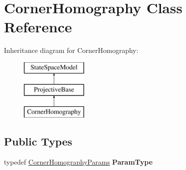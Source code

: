 \hypertarget{classCornerHomography}{\section{Corner\-Homography Class Reference}
\label{classCornerHomography}
}
Inheritance diagram for Corner\-Homography\-:\begin{figure}[H]
\begin{center}
\leavevmode
\includegraphics[height=3.000000cm]{classCornerHomography}
\end{center}
\end{figure}
\subsection*{Public Types}
\begin{DoxyCompactItemize}
\item 
\hypertarget{classCornerHomography_a1f566f572c32007c1af2227ca3db7ea8}{typedef \hyperlink{structCornerHomographyParams}{Corner\-Homography\-Params} {\bfseries Param\-Type}}\label{classCornerHomography_a1f566f572c32007c1af2227ca3db7ea8}

\end{DoxyCompactItemize}
